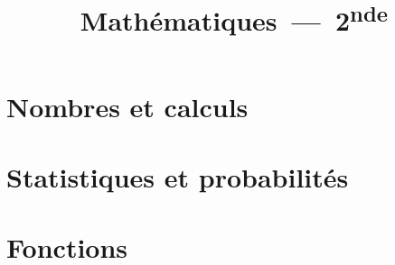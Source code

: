 \documentclass{poly}
\title{Mathématiques~---~2\textsuperscript{nde}}
\author{}
\date{\figureA{}}
\begin{document}
\maketitle
\tableofcontents


\part{Nombres et calculs}










\part{Statistiques et probabilités}








\part{Fonctions}








\end{document}
